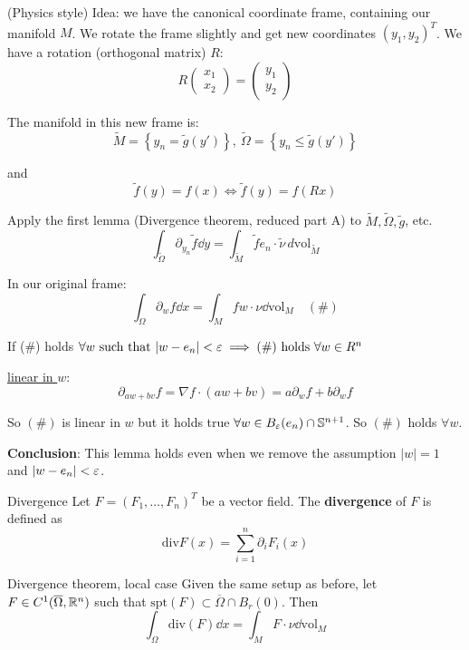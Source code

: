 \documentclass[12pt]{article}
\begin{document}
\begin{proofbox}
    (Physics style) Idea: we have the canonical coordinate frame, containing our manifold $M$. We rotate the frame slightly and get new coordinates $(y_1,y_2)^T$. We have a rotation (orthogonal matrix) $R$:
    $$
        R \begin{pmatrix} x_1 \\ x_2 \end{pmatrix} = \begin{pmatrix} y_1 \\ y_2 \end{pmatrix}
    $$

    The manifold in this new frame is:
    $$
        \tilde{M} = \left\{y_n = \tilde{g}(y')\right\},\ \tilde{\Omega} = \left\{y_n \leq \tilde{g}(y')\right\}
    $$

    and
    $$
        \tilde{f}(y) = f(x) \iff \tilde{f}(y) = f(Rx)
    $$

    Apply the first lemma (Divergence theorem, reduced part A) to $\tilde{M}, \tilde{\Omega}, \tilde{g}$, etc.
    $$
        \int_{\tilde{\Omega}} \partial_{y_n} \tilde{f} \dd y = \int_{\tilde{M}} \tilde{f} e_n \cdot \tilde{\nu} \, d\mathrm{vol}_{\tilde{M}}
    $$

    In our original frame:
    $$
        \int_{\Omega} \partial_w f \dd x = \int_M f w \cdot \nu \dd \mathrm{vol}_M \quad (\#)
    $$

    If (\#) holds $\forall w \text{ such that } |w - e_n| < \varepsilon \implies (\#) \text{ holds } \forall w \in R^n$

    \underline{linear in $w$}:
    $$
        \partial_{aw + bv} f = \nabla f \cdot (aw + bv) = a \partial_w f + b \partial_w f
    $$

    So $(\#)$ is linear in $w$ but it holds true $\forall w \in B_\varepsilon(e_n) \cap \mathbb{S}^{n+1}$. So $(\#)$ holds $\forall w$.

    \textbf{Conclusion}: This lemma holds even when we remove the assumption $|w| = 1$ and $|w - e_n| < \varepsilon$.
\end{proofbox}

\begin{definition}{Divergence}{}
    Let $F=(F_1,\dots,F_n)^T$ be a vector field. The \textbf{divergence} of $F$ is defined as
    $$
        \mathrm{div} F(x) = \sum_{i = 1}^{n} \partial_i F_i(x)
    $$
\end{definition}

\begin{theorem}{Divergence theorem, local case}{}
    Given the same setup as before, let $F \in C^1(\overline{\Omega}, \mathbb{R}^n)$ such that $\mathrm{spt}(F) \subset \overline{\Omega} \cap B_r(0)$. Then
    $$
        \int_{\Omega} \mathrm{div}(F) \dd x = \int_M F \cdot \nu \dd \mathrm{vol}_M
    $$
\end{theorem}
\end{document}
